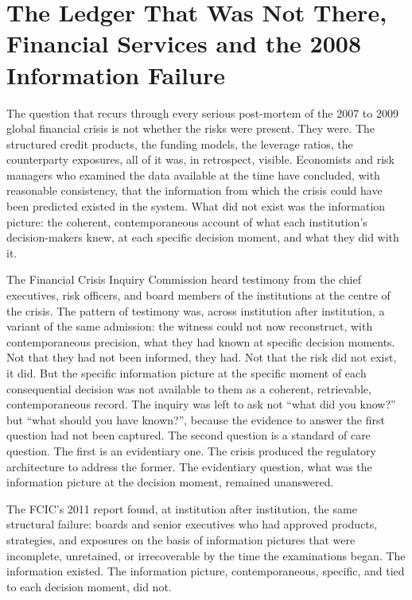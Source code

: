 
\chapter{The Ledger That Was Not There, Financial Services and the 2008 Information Failure}

The question that recurs through every serious post-mortem of the 2007 to 2009 global financial crisis is not whether the risks were present. They were. The structured credit products, the funding models, the leverage ratios, the counterparty exposures, all of it was, in retrospect, visible. Economists and risk managers who examined the data available at the time have concluded, with reasonable consistency, that the information from which the crisis could have been predicted existed in the system. What did not exist was the information picture: the coherent, contemporaneous account of what each institution's decision-makers knew, at each specific decision moment, and what they did with it.

The Financial Crisis Inquiry Commission heard testimony from the chief executives, risk officers, and board members of the institutions at the centre of the crisis. The pattern of testimony was, across institution after institution, a variant of the same admission: the witness could not now reconstruct, with contemporaneous precision, what they had known at specific decision moments. Not that they had not been informed, they had. Not that the risk did not exist, it did. But the specific information picture at the specific moment of each consequential decision was not available to them as a coherent, retrievable, contemporaneous record. The inquiry was left to ask not ``what did you know?'' but ``what should you have known?'', because the evidence to answer the first question had not been captured. The second question is a standard of care question. The first is an evidentiary one. The crisis produced the regulatory architecture to address the former. The evidentiary question, what was the information picture at the decision moment, remained unanswered.

The FCIC's 2011 report found, at institution after institution, the same structural failure: boards and senior executives who had approved products, strategies, and exposures on the basis of information pictures that were incomplete, unretained, or irrecoverable by the time the examinations began. The information existed. The information picture, contemporaneous, specific, and tied to each decision moment, did not.

